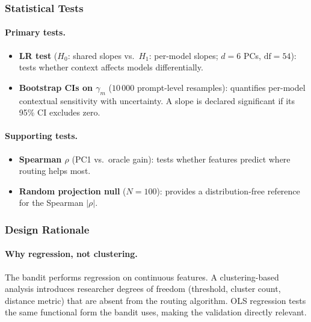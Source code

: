 \subsubsection{Statistical Tests}

\paragraph{Primary tests.}
\begin{itemize}[leftmargin=*,noitemsep,topsep=0pt]
    \item \textbf{LR test} ($H_0$: shared slopes vs.\ $H_1$: per-model
          slopes; $d{=}6$ PCs, $\text{df}{=}54$): tests whether context
          affects models differentially.
    \item \textbf{Bootstrap CIs on $\gamma_m$} ($10\,000$ prompt-level
          resamples): quantifies per-model contextual sensitivity with
          uncertainty.  A slope is declared significant if its 95\% CI
          excludes zero.
\end{itemize}

\paragraph{Supporting tests.}
\begin{itemize}[leftmargin=*,noitemsep,topsep=0pt]
    \item \textbf{Spearman $\rho$} (PC1 vs.\ oracle gain): tests whether
          features predict where routing helps most.
    \item \textbf{Random projection null} ($N{=}100$): provides a
          distribution-free reference for the Spearman $|\rho|$.
\end{itemize}

\subsubsection{Design Rationale}

\paragraph{Why regression, not clustering.}
The bandit performs regression on continuous features.  A clustering-based
analysis introduces researcher degrees of freedom (threshold, cluster
count, distance metric) that are absent from the routing algorithm.
OLS regression tests the same functional form the bandit uses, making
the validation directly relevant.

